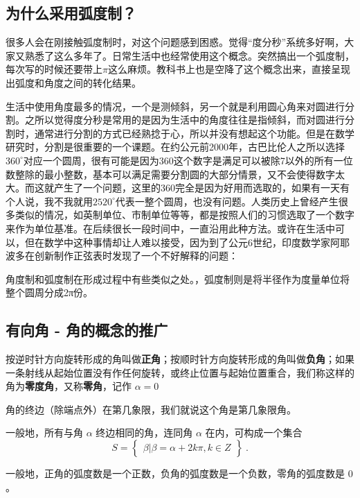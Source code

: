 \subsection{为什么采用弧度制？}

很多人会在刚接触弧度制时，对这个问题感到困惑。觉得“度分秒”系统多好啊，大家又熟悉了这么多年了。日常生活中也经常使用这个概念。突然搞出一个弧度制，每次写的时候还要带上$\pi$这么麻烦。教科书上也是空降了这个概念出来，直接呈现出弧度和角度之间的转化结果。

生活中使用角度最多的情况，一个是测倾斜，另一个就是利用圆心角来对圆进行分割。之所以觉得度分秒是常用的是因为生活中的角度往往是指倾斜，而对圆进行分割时，通常进行分割的方式已经熟捻于心，所以并没有想起这个功能。但是在数学研究时，分割是很重要的一个课题。在约公元前2000年，古巴比伦人之所以选择$360^\circ$对应一个圆周，很有可能是因为360这个数字是满足可以被除7以外的所有一位数整除的最小整数，基本可以满足需要分割圆的大部分情景，又不会使得数字太大。而这就产生了一个问题，这里的360完全是因为好用而选取的，如果有一天有个人说，我不我就用$2520^\circ$代表一整个圆周，也没有问题。人类历史上曾经产生很多类似的情况，如英制单位、市制单位等等，都是按照人们的习惯选取了一个数字来作为单位基准。在后续很长一段时间中，一直沿用此种方法。或许在生活中可以，但在数学中这种事情却让人难以接受，因为到了公元6世纪，印度数学家阿耶波多在创新制作正弦表时发现了一个不好解释的问题：


角度制和弧度制在形成过程中有些类似之处。，弧度制则是将半径作为度量单位将整个圆周分成2π份。

\subsection{有向角 - 角的概念的推广}


按逆时针方向旋转形成的角叫做\textbf{正角}；按顺时针方向旋转形成的角叫做\textbf{负角}；如果一条射线从起始位置没有作任何旋转，或终止位置与起始位置重合，我们称这样的角为\textbf{零度角}，又称\textbf{零角}，记作 $\alpha = 0$

角的终边（除端点外）在第几象限，我们就说这个角是第几象限角。

一般地，所有与角 $\alpha$ 终边相同的角，连同角 $\alpha$ 在内，可构成一个集合
\begin{equation}
S = \begin{Bmatrix} \beta|\beta=\alpha+2k\pi,k \in Z \end{Bmatrix}~.
\end{equation}


一般地，正角的弧度数是一个正数，负角的弧度数是一个负数，零角的弧度数是 $0$。
